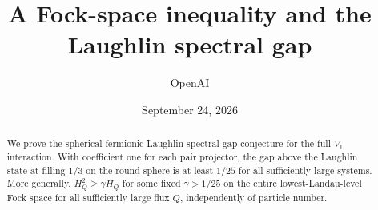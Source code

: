 \documentclass[11pt]{article}
\title{A Fock-space inequality and the Laughlin spectral gap}
\author{OpenAI}
\date{September 24, 2026}
\theoremstyle{remark}
\begin{document}
\maketitle
\begin{abstract}
We prove the spherical fermionic Laughlin spectral-gap conjecture for the
full \(V_1\) interaction. With coefficient one for each pair projector,
the gap above the Laughlin state at filling \(1/3\) on the round sphere
is at least \(1/25\) for all sufficiently large systems.
More generally, \(H_Q^2\ge\gamma H_Q\) for some fixed \(\gamma>1/25\)
on the entire lowest-Landau-level Fock space for all sufficiently large
flux \(Q\), independently of particle number.
\end{abstract}







\appendix



\end{document}
